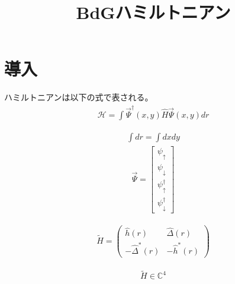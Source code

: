 \documentclass{jarticle}
\begin{document}
\title{BdGハミルトニアン}
\maketitle

\tableofcontents
\newpage
\section{導入}

ハミルトニアンは以下の式で表される。
 \begin{align}
    \mathcal{H}=\int\vec{\Psi}^\dagger(x,y)\hat{H}\vec{\Psi}(x,y)dr
 \end{align}

\begin{align}
\int{dr}=\int{dxdy}
\end{align}
\begin{align}
\vec{\Psi}=\begin{bmatrix}
\psi_{\uparrow} \\
\psi_{\downarrow} \\
\psi_{\uparrow}^\dagger \\
\psi_{\downarrow}^\dagger
\end{bmatrix}
\end{align}

\begin{align}
\tilde{H}=
\begin{pmatrix}
	\hat{h}(r) & \hat{\Delta}(r) \\
	-\hat{\Delta}^{*}(r) & -\hat{h}^{*}(r)
\end{pmatrix}
\end{align}

\begin{align}
\tilde{H}\in\mathbb{C}^4
\end{align}
\end{document}
